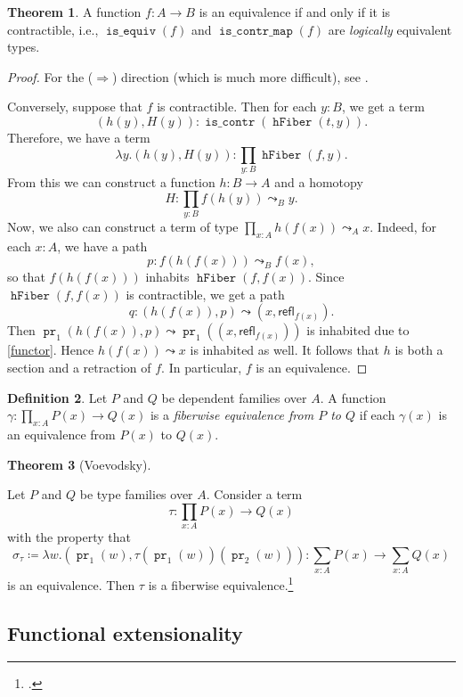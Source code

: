 \documentclass[10pt,letterpaper,cm]{nupset}
\theoremstyle{definition}
\newtheorem{definition}{Definition}[subsection]
\theoremstyle{theorem}
\newtheorem{theorem}[definition]{Theorem}
\theoremstyle{remark}
\newcommand{\refl}{\mathsf{refl}}
\newcommand{\0}{\mathbf{0}}
\newcommand{\1}{\mathbf{1}}
\newcommand{\2}{\mathbf{2}}
\DeclareMathOperator{\isequiv}{\mathtt{is\_equiv}}
\DeclareMathOperator{\hfiber}{\mathtt{hFiber}}
\DeclareMathOperator{\iscont}{\mathtt{is\_contr}}
\DeclareMathOperator{\iscontmap}{\mathtt{is\_contr\_map}}
\DeclareMathOperator{\pr}{\mathtt{pr}}
\begin{document}
\begin{theorem}\label{equiv-cont}
 A function $f : A \to B$ is an equivalence if and only if it is contractible, i.e.,  $\isequiv(f)$ and $\iscontmap(f)$ are \emph{logically} equivalent types.
\end{theorem}
\begin{proof}
For the ($\Longrightarrow$) direction (which is much more difficult), see \cite[Theorem 6.3.3]{Rijke}.

\smallskip
Conversely, suppose that $f$ is contractible. Then for each $y:B$, we get a term $$\left(h(y), H(y)\right) :\iscont(\hfiber(t,y)).$$ Therefore, we have a term $$ \lambda y. \left(h(y), H(y)\right) : \prod_{y:B}\hfiber(f,y)    .$$ From this we can construct a function $h: B \to A$ and a homotopy $$H: \prod_{y:B} f(h(y)) \leadsto_B y.$$ Now, we also can construct a term of type $\prod_{x : A} h(f(x)) \leadsto_A x$. Indeed, for each $x:A$, we have a path $$p: f(h(f(x))) \leadsto_B f(x),$$ so that $f(h(f(x)))$ inhabits $\hfiber(f, f(x))$. Since $\hfiber(f, f(x))$ is contractible, we get a path $$q : \left(h(f(x)), p\right) \leadsto \left(x, \refl_{f(x)}\right).$$ Then $\pr_1(h(f(x)), p) \leadsto \pr_1((x, \refl_{f(x)}))$ is inhabited due to \cref{functor}. Hence $h(f(x)) \leadsto x$ is inhabited as well. It follows that $h$ is both a section and a retraction of $f$. In particular, $f$ is an equivalence. 
\end{proof}


\begin{definition}
Let $P$ and $Q$ be dependent families over $A$. A function $\gamma : \prod_{x:A}P(x) \to Q(x)$ is a \textit{fiberwise equivalence from $P$ to $Q$} if each $\gamma(x)$ is an equivalence from  $P(x)$ to $Q(x)$. 
\end{definition}

\begin{theorem}[Voevodsky]\label{fwe}

Let $P$ and $Q$ be type families over $A$. Consider a term $$\tau : \prod_{x:A} P(x) \to Q(x)$$ with the property that $$\sigma_{\tau} \coloneqq \lambda w .\left(\pr_{1}(w), \tau\left(\pr_{1}(w)\right)\left(\pr_{2}(w)\right)\right) :    \sum_{x:A}P(x) \to \sum_{x:A}Q(x)  $$ is an equivalence. Then $\tau$ is a fiberwise equivalence.\footnote{\cite[Theorem 2.4.19]{Rijke2}.} 
\end{theorem}

\subsection*{Functional extensionality}
\end{document}
